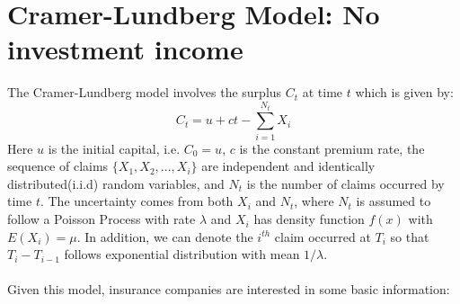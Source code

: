 \documentclass[12pt]{article}
\begin{document}
\section{Cramer-Lundberg Model: No investment income}
The Cramer-Lundberg model involves the surplus $C_t$ at time \(t\) which is given by\cite{ref01}:
\begin{equation}\label{CL-model}
    C_t = u+ct-\sum_{i=1}^{N_t}X_i
\end{equation}
Here \(u\) is the initial capital, i.e.  \(C_0=u\), \(c\) is the constant premium rate, the sequence of claims \(\{X_1, X_2, ..., X_i\}\) are independent and identically distributed(i.i.d) random variables, and \(N_t\) is the number of claims occurred by time \(t\). The uncertainty comes from both \(X_i\) and \(N_t\), where \(N_t\) is assumed to follow a Poisson Process with rate \(\lambda\) and \(X_i\) has density function \(f(x)\) with \(E(X_i)=\mu\). In addition, we can denote the \(i^{th}\) claim occurred at \(T_i\) so that \(T_i-T_{i-1}\) follows exponential distribution with mean \(1/\lambda\).\\
 \\
Given this model, insurance companies are interested in some basic information:
\end{document}
